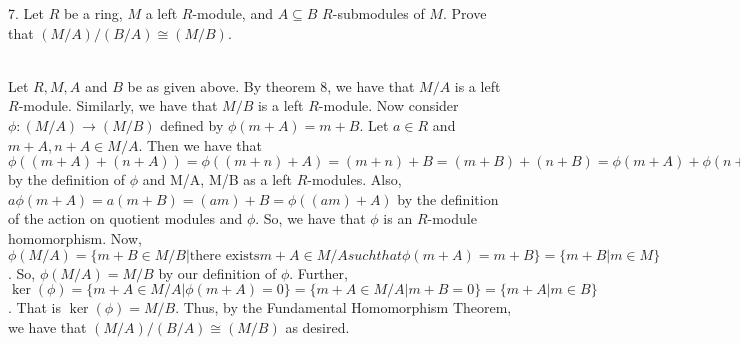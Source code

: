 7. Let $R$ be a ring, $M$ a left $R$-module, and $A\subseteq B$ $R$-submodules of $M$. Prove that
$(M/A)/(B/A)\cong(M/B)$.

\begin{solution}\renewcommand{\qedsymbol}{}\ \\
    Let $R, M, A$ and $B$ be as given above. By theorem 8, we have that $M/A$ is a left $R$-module.
    Similarly, we have that $M/B$ is a left $R$-module. Now consider $\phi:(M/A)\rightarrow(M/B)$
    defined by $\phi(m+A)=m+B$. Let $a\in R$ and $m+A,n+A\in M/A$. Then we have that
    $\phi((m+A)+(n+A))=\phi((m+n)+A)=(m+n)+B=(m+B)+(n+B)=\phi(m+A)+\phi(n+A)$ by the definition of
    $\phi$ and M/A, M/B as a left $R$-modules. Also, $a\phi(m+A)=a(m+B)=(am)+B=\phi((am)+A)$ by the
    definition of the action on quotient modules and $\phi$. So, we have that $\phi$ is an $R$-module
    homomorphism. Now,
    $\phi(M/A)=\{m+B\in M/B|\text{there exists} m+A\in M/A such that \phi(m+A)=m+B\}=\{m+B|m\in M\}$.
    So, $\phi(M/A)=M/B$ by our definition of $\phi$. Further,
    $\ker(\phi)=\{m+A\in M/A|\phi(m+A)=0\}=\{m+A\in M/A|m+B=0\}=\{m+A|m\in B\}$.
    That is $\ker(\phi)=M/B$. Thus, by the Fundamental Homomorphism Theorem, we have that
    $(M/A)/(B/A)\cong(M/B)$ as desired.

\end{solution}